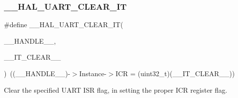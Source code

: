 \subsubsection{\texorpdfstring{\+\_\+\+\_\+\+H\+A\+L\+\_\+\+U\+A\+R\+T\+\_\+\+C\+L\+E\+A\+R\+\_\+\+IT}{\_\_HAL\_UART\_CLEAR\_IT}}
{\footnotesize\ttfamily \#define \+\_\+\+\_\+\+H\+A\+L\+\_\+\+U\+A\+R\+T\+\_\+\+C\+L\+E\+A\+R\+\_\+\+IT(\begin{DoxyParamCaption}\item[{}]{\+\_\+\+\_\+\+H\+A\+N\+D\+L\+E\+\_\+\+\_\+,  }\item[{}]{\+\_\+\+\_\+\+I\+T\+\_\+\+C\+L\+E\+A\+R\+\_\+\+\_\+ }\end{DoxyParamCaption})~((\+\_\+\+\_\+\+H\+A\+N\+D\+L\+E\+\_\+\+\_\+)-\/$>$Instance-\/$>$I\+CR = (uint32\+\_\+t)(\+\_\+\+\_\+\+I\+T\+\_\+\+C\+L\+E\+A\+R\+\_\+\+\_\+))}



Clear the specified U\+A\+RT I\+SR flag, in setting the proper I\+CR register flag. 


